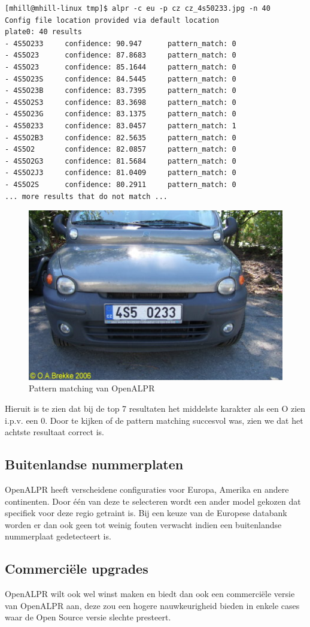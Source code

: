 \begin{lstlisting}
[mhill@mhill-linux tmp]$ alpr -c eu -p cz cz_4s50233.jpg -n 40
Config file location provided via default location
plate0: 40 results
- 4S5O233     confidence: 90.947      pattern_match: 0
- 4S5O23      confidence: 87.8683     pattern_match: 0
- 4S5O23      confidence: 85.1644     pattern_match: 0
- 4S5O23S     confidence: 84.5445     pattern_match: 0
- 4S5O23B     confidence: 83.7395     pattern_match: 0
- 4S5O2S3     confidence: 83.3698     pattern_match: 0
- 4S5O23G     confidence: 83.1375     pattern_match: 0
- 4S50233     confidence: 83.0457     pattern_match: 1
- 4S5O2B3     confidence: 82.5635     pattern_match: 0
- 4S5O2       confidence: 82.0857     pattern_match: 0
- 4S5O2G3     confidence: 81.5684     pattern_match: 0
- 4S5O2J3     confidence: 81.0409     pattern_match: 0
- 4S5O2S      confidence: 80.2911     pattern_match: 0
... more results that do not match ...
\end{lstlisting}

\begin{figure}[h!]
	\centering
	\includegraphics[width=\linewidth]{img/pattern-matching.jpg}
	\caption{Pattern matching van OpenALPR \autocite{openalpr2015pattern}}
	\label{patternmatching}
\end{figure}

Hieruit is te zien dat bij de top 7 resultaten het middelste karakter als een O zien i.p.v. een 0. Door te kijken of de pattern matching succesvol was, zien we dat het achtste resultaat correct is.

\subsection{Buitenlandse nummerplaten}
OpenALPR heeft verscheidene configuraties voor Europa, Amerika en andere continenten. Door één van deze te selecteren wordt een ander model gekozen dat specifiek voor deze regio getraint is. Bij een keuze van de Europese databank worden er dan ook geen tot weinig fouten verwacht indien een buitenlandse nummerplaat gedetecteert is.

\subsection{Commerciële upgrades}
OpenALPR wilt ook wel winst maken en biedt dan ook een commerciële versie van OpenALPR aan, deze zou een hogere nauwkeurigheid bieden in enkele cases waar de Open Source versie slechte presteert. \autocite{openalpr2019benchmark}
